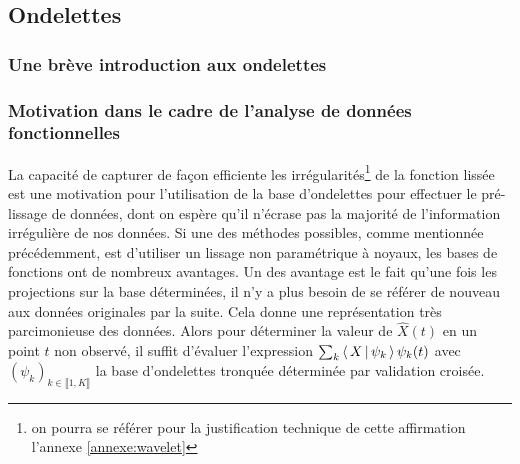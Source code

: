 

\subsection{Ondelettes}
\subsubsection{Une brève introduction aux ondelettes}




\subsubsection{Motivation dans le cadre de l'analyse de données fonctionnelles}

La capacité de capturer de façon efficiente les irrégularités\footnote{on pourra se référer pour la justification technique de cette affirmation l'annexe \ref{annexe:wavelet}} de la fonction lissée est une motivation pour l'utilisation de la base d'ondelettes pour effectuer le pré-lissage de données, dont on espère qu'il n'écrase pas la majorité de l'information irrégulière de nos données. Si une des méthodes possibles, comme mentionnée précédemment, est d'utiliser un lissage non paramétrique à noyaux, les bases de fonctions ont de nombreux avantages. Un des avantage est le fait qu'une fois les projections sur la base déterminées, il n'y a plus besoin de se référer de nouveau aux données originales par la suite. Cela donne une représentation très parcimonieuse des données. Alors pour déterminer la valeur de $\widehat X(t)$ en un point $t$ non observé, il suffit d'évaluer l'expression $\sum_k \left\langle \, X \, \vert \, \psi_k \, \right\rangle \psi_k(t)$ avec $(\psi_k)_{k \in \llbracket 1, K \rrbracket}$ la base d'ondelettes tronquée déterminée par validation croisée.
